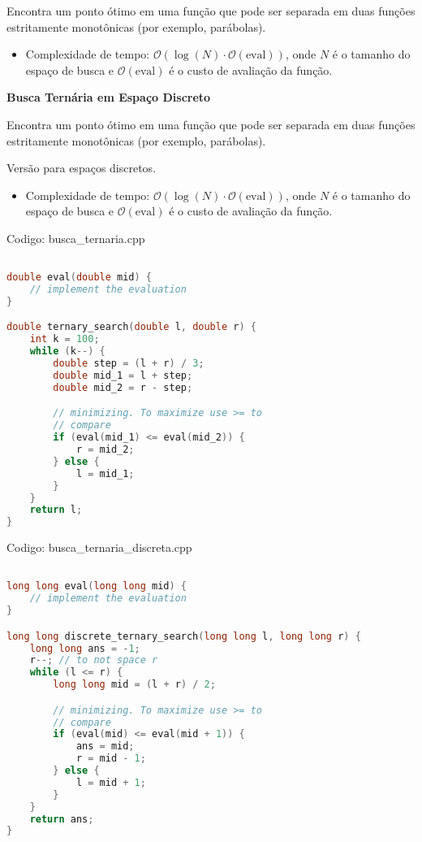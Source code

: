 \documentclass[10pt, a4paper, oneside]{book}
\begin{document}
Encontra um ponto ótimo em uma função que pode ser separada em duas funções estritamente monotônicas (por exemplo, parábolas).



\begin{itemize}
\item Complexidade de tempo: $\mathcal{O}(\log(N) \cdot \mathcal{O}(\text{eval}))$, onde \(N\) é o tamanho do espaço de busca e \(\mathcal{O}(\text{eval})\) é o custo de avaliação da função.
\end{itemize}



\textbf{Busca Ternária em Espaço Discreto} 



Encontra um ponto ótimo em uma função que pode ser separada em duas funções estritamente monotônicas (por exemplo, parábolas).

Versão para espaços discretos.



\begin{itemize}
\item Complexidade de tempo: $\mathcal{O}(\log(N) \cdot \mathcal{O}(\text{eval}))$, onde \(N\) é o tamanho do espaço de busca e \(\mathcal{O}(\text{eval})\) é o custo de avaliação da função.
\end{itemize}

\hfill

Codigo: busca\_ternaria.cpp

\begin{lstlisting}[language=C++]

double eval(double mid) {
    // implement the evaluation
}

double ternary_search(double l, double r) {
    int k = 100;
    while (k--) {
        double step = (l + r) / 3;
        double mid_1 = l + step;
        double mid_2 = r - step;

        // minimizing. To maximize use >= to
        // compare
        if (eval(mid_1) <= eval(mid_2)) {
            r = mid_2;
        } else {
            l = mid_1;
        }
    }
    return l;
}
\end{lstlisting}
\hfill

Codigo: busca\_ternaria\_discreta.cpp

\begin{lstlisting}[language=C++]

long long eval(long long mid) {
    // implement the evaluation
}

long long discrete_ternary_search(long long l, long long r) {
    long long ans = -1;
    r--; // to not space r
    while (l <= r) {
        long long mid = (l + r) / 2;

        // minimizing. To maximize use >= to
        // compare
        if (eval(mid) <= eval(mid + 1)) {
            ans = mid;
            r = mid - 1;
        } else {
            l = mid + 1;
        }
    }
    return ans;
}
\end{lstlisting}
\hfill
\end{document}
